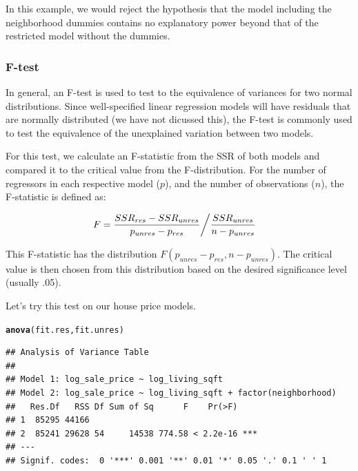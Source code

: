 \documentclass[10pt]{article}\usepackage[]{graphicx}\usepackage[]{color}
\makeatletter
\newcommand{\hlstd}[1]{\textcolor[rgb]{0.345,0.345,0.345}{#1}}%
\newcommand{\hlkwd}[1]{\textcolor[rgb]{0.737,0.353,0.396}{\textbf{#1}}}%
\newenvironment{kframe}{%
 \def\at@end@of@kframe{}%
 \ifinner\ifhmode%
  \def\at@end@of@kframe{\end{minipage}}%
  \begin{minipage}{\columnwidth}%
 \fi\fi%
 \def\FrameCommand##1{\hskip\@totalleftmargin \hskip-\fboxsep
 \colorbox{shadecolor}{##1}\hskip-\fboxsep
     \hskip-\linewidth \hskip-\@totalleftmargin \hskip\columnwidth}%
 \MakeFramed {\advance\hsize-\width
   \@totalleftmargin\z@ \linewidth\hsize
   \@setminipage}}%
 {\par\unskip\endMakeFramed%
 \at@end@of@kframe}
\newenvironment{knitrout}{}{} %
\makeatother
\begin{document}
In this example, we would reject the hypothesis that the model including the neighborhood dummies contains no explanatory power beyond that of the restricted model without the dummies.

\subsubsection*{F-test}

In general, an F-test is used to test to the equivalence of variances for two normal distributions. Since well-specified linear regression models will have residuals that are normally distributed (we have not dicussed this), the F-test is commonly used to test the equivalence of the unexplained variation between two models.

For this test, we calculate an F-statistic from the SSR of both models and compared it to the critical value from the F-distribution. For the number of regressors in each respective model ($p$), and the number of observations ($n$), the F-statistic is defined as:

\begin{align}
F &= \frac{SSR_{res} - SSR_{unres}}{p_{unres} - p_{res}} \bigg{/} \frac{SSR_{unres}}{n - p_{unres}}
\end{align}

This F-statistic has the distribution $F(p_{unres} - p_{res}, n - p_{unres})$. The critical value is then chosen from this distribution based on the desired significance level (usually .05).

Let's try this test on our house price models.

\begin{knitrout}\small
{}\color{fgcolor}\begin{kframe}
\begin{alltt}
\hlkwd{anova}\hlstd{(fit.res,fit.unres)}
\end{alltt}
\begin{verbatim}
## Analysis of Variance Table
## 
## Model 1: log_sale_price ~ log_living_sqft
## Model 2: log_sale_price ~ log_living_sqft + factor(neighborhood)
##   Res.Df   RSS Df Sum of Sq      F    Pr(>F)    
## 1  85295 44166                                  
## 2  85241 29628 54     14538 774.58 < 2.2e-16 ***
## ---
## Signif. codes:  0 '***' 0.001 '**' 0.01 '*' 0.05 '.' 0.1 ' ' 1
\end{verbatim}
\end{kframe}
\end{knitrout}
\end{document}
